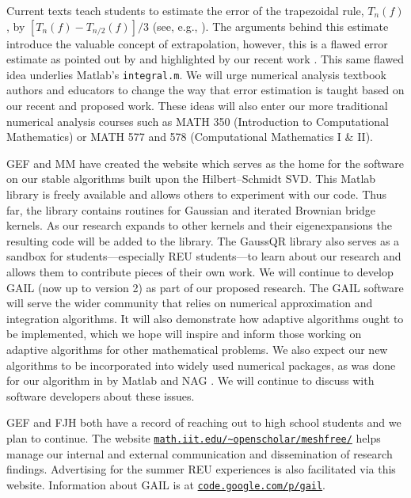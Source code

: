 \documentclass[11pt]{NSFamsart}
\newcommand{\Matlab}{{\sc Matlab}\xspace}
\begin{document}
\begin{description}[leftmargin=0ex]
Current texts teach students to estimate the error of the trapezoidal rule, $T_n(f)$, by $[T_n(f)-T_{n/2}(f)]/3$ (see, e.g., \cite[p.\ 223--224]{BurFai10}).  The arguments behind this estimate introduce the valuable concept of extrapolation, however, this is a flawed error estimate as pointed out by \cite{Lyn83} and highlighted by our recent work \cite{HicEtal14b}.  This same flawed idea underlies \Matlab's {\tt integral.m}.  We will urge numerical analysis textbook authors and educators to change the way that error estimation is taught based on our recent and proposed work.  These ideas will also enter our more traditional numerical analysis courses such as MATH 350 (Introduction to Computational Mathematics) or MATH 577 and 578 (Computational Mathematics I \& II).

\item[Creating Software and Collaborating with Software Developers]
GEF and MM have created the website \citep{McCFBG13} which serves as the home for the software on our stable algorithms built upon the Hilbert--Schmidt SVD. This \Matlab library is freely available and allows others to experiment with our code. Thus far, the library contains routines for Gaussian and iterated Brownian bridge kernels. As our research expands to other kernels and their eigenexpansions the resulting code will be added to the library. The GaussQR library also serves as a sandbox for students---especially REU students---to learn about our research and allows them to contribute pieces of their own work.
We will continue to develop GAIL \citep{ChoEtal14a} (now up to version 2) as part of our proposed research.  The GAIL software will serve the wider community that relies on numerical approximation and integration algorithms.  It will also demonstrate how adaptive algorithms ought to be implemented, which we hope will inspire and inform those working on adaptive algorithms for other mathematical problems.  We also expect our new algorithms to be incorporated into widely used numerical packages, as was done for our algorithm in \cite{HonHic00a} by \Matlab \citep{MAT8.4} and NAG \citep{NAG23}.  We will continue to discuss with software developers about these issues.

\item[Reaching Out]
GEF and FJH both have a record of reaching out to high school students and we plan to continue. The website \href{http://math.iit.edu/~openscholar/meshfree/}{\nolinkurl{math.iit.edu/~openscholar/meshfree/}} helps manage our internal and external communication and dissemination of research findings. Advertising for the summer REU experiences is also facilitated via this website.  Information about GAIL is at \href{http://code.google.com/p/gail}{\nolinkurl{code.google.com/p/gail}}.
\end{description}

\newpage
\clearpage
{}



\renewcommand{\refname}{\hfill \textbf{\large References Cited} \hfill \hfill}                   %
\renewcommand{\bibliofont}{\normalsize}


\end{document}
